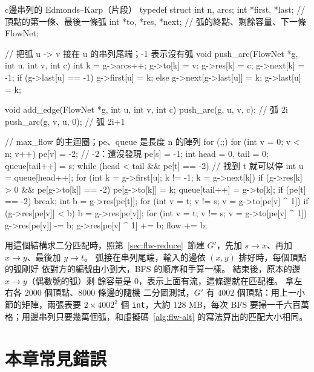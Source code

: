 \begin{code}{c}{邊串列的 Edmonds--Karp（片段）}
typedef struct {
    int n, arcs;
    int *first, *last;          // 頂點的第一條、最後一條弧
    int *to, *res, *next;       // 弧的終點、剩餘容量、下一條
} FlowNet;

// 把弧 u -> v 接在 u 的串列尾端；-1 表示沒有弧
void push_arc(FlowNet *g, int u, int v, int c)
{
    int k = g->arcs++;
    g->to[k] = v;
    g->res[k] = c;
    g->next[k] = -1;
    if (g->last[u] == -1)
        g->first[u] = k;
    else
        g->next[g->last[u]] = k;
    g->last[u] = k;
}

void add_edge(FlowNet *g, int u, int v, int c)
{
    push_arc(g, u, v, c);       // 弧 2i
    push_arc(g, v, u, 0);       // 弧 2i+1
}

// max_flow 的主迴圈；pe、queue 是長度 n 的陣列
for (;;) {
    for (int v = 0; v < n; v++)
        pe[v] = -2;                         // -2：還沒發現
    pe[s] = -1;
    int head = 0, tail = 0;
    queue[tail++] = s;
    while (head < tail && pe[t] == -2) {    // 找到 t 就可以停
        int u = queue[head++];
        for (int k = g->first[u]; k != -1; k = g->next[k])
            if (g->res[k] > 0 && pe[g->to[k]] == -2) {
                pe[g->to[k]] = k;
                queue[tail++] = g->to[k];
            }
    }
    if (pe[t] == -2)
        break;
    int b = g->res[pe[t]];
    for (int v = t; v != s; v = g->to[pe[v] ^ 1])
        if (g->res[pe[v]] < b)
            b = g->res[pe[v]];
    for (int v = t; v != s; v = g->to[pe[v] ^ 1]) {
        g->res[pe[v]] -= b;
        g->res[pe[v] ^ 1] += b;
    }
    flow += b;
}
\end{code}

用這個結構求二分匹配時，照第~\ref{sec:flw-reduce}~節建 $G'$，先加 $s \to x$、再加
$x \to y$、最後加 $y \to t$。 弧接在串列尾端，輸入的邊依 $(x, y)$ 排好時，每個頂點的弧剛好
依對方的編號由小到大，BFS 的順序和手算一樣。 結束後，原本的邊 $x \to y$（偶數號的弧）剩
餘容量是 $0$，表示上面有流，這條邊就在匹配裡。 拿左右各 $2000$ 個頂點、$8000$ 條邊的隨機
二分圖測試，$G'$ 有 $4002$ 個頂點：用上一小節的矩陣，兩張表要 $2 \times 4002^2$ 個
\texttt{int}，大約 $128$ MB，每次 BFS 要掃一千六百萬格；用邊串列只要幾萬個弧，和虛擬碼~\ref{alg:flw-alt}
的寫法算出的匹配大小相同。

\section{本章常見錯誤}
\label{sec:flw-pitfalls}

